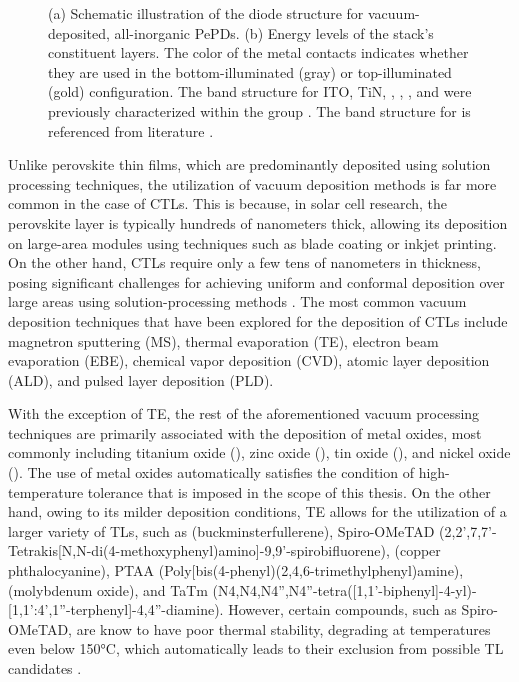 \begin{figure}[htbp]
    \caption{(a) Schematic illustration of the diode structure for vacuum-deposited, all-inorganic PePDs. (b) Energy levels of the stack's constituent layers. The color of the metal contacts indicates whether they are used in the bottom-illuminated (gray) or top-illuminated (gold) configuration. The band structure for ITO, TiN, , , , and  were previously characterized within the group \cite{Siddik2024PbSDetectors,Siddik2023Interface-EngineeredApplications}. The band structure for  is referenced from literature \cite{Li2020High-EfficiencyLayers}.
    }
    \label{fig:ch2:stack_and_energy_landscape}
\end{figure}

Unlike perovskite thin films, which are predominantly deposited using solution processing techniques, the utilization of vacuum deposition methods is far more common in the case of CTLs. This is because, in solar cell research, the perovskite layer is typically hundreds of nanometers thick, allowing its deposition on large-area modules using techniques such as blade coating or inkjet printing. On the other hand, CTLs require only a few tens of nanometers in thickness, posing significant challenges for achieving uniform and conformal deposition over large areas using solution-processing methods \cite{Luo2025VacuumModules}. The most common vacuum deposition techniques that have been explored for the deposition of CTLs include magnetron sputtering (MS), thermal evaporation (TE), electron beam evaporation (EBE), chemical vapor deposition (CVD), atomic layer deposition (ALD), and pulsed layer deposition (PLD).

With the exception of TE, the rest of the aforementioned vacuum processing techniques are primarily associated with the deposition of metal oxides, most commonly including titanium oxide (), zinc oxide (), tin oxide (), and nickel oxide (). The use of metal oxides automatically satisfies the condition of high-temperature tolerance that is imposed in the scope of this thesis. On the other hand, owing to its milder deposition conditions, TE allows for the utilization of a larger variety of TLs, such as  (buckminsterfullerene), Spiro-OMeTAD (2,2',7,7'-Tetrakis[N,N-di(4-methoxyphenyl)amino]-9,9'-spirobifluorene),  (copper phthalocyanine), PTAA (Poly[bis(4-phenyl)(2,4,6-trimethylphenyl)amine),  (molybdenum oxide), and TaTm (N4,N4,N4'',N4''-tetra([1,1'-biphenyl]-4-yl)-[1,1':4',1''-terphenyl]-4,4''-diamine). However, certain compounds, such as Spiro-OMeTAD, are know to have poor thermal stability, degrading at temperatures even below 150°C, which automatically leads to their exclusion from possible TL candidates \cite{Zhao2017EffectCells, Tumen-Ulzii2020UnderstandingTemperature, Jeong2022ChallengesCells}. 


